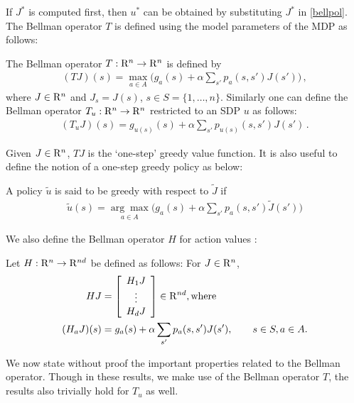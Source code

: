 If $J^*$ is computed first, then $u^*$ can be obtained by substituting $J^*$ in \eqref{bellpol}. The Bellman operator $T$ is defined using the model parameters of the MDP as follows:
\begin{definition}
The Bellman operator $T: \mathrm{R}^n \to \mathrm{R}^n$ is defined by 
\begin{align}
(TJ)(s)=\max_{a \in A}\big(g_a(s)+\alpha \sum_{s'} p_a(s,s')J(s')\big)\,, 
\end{align}
where $J\in \mathrm{R}^n$ and $J_s = J(s)$, $s\in S = \{1,\dots,n\}$.  
Similarly one can define the Bellman operator $T_u:\mathrm{R}^n \to \mathrm{R}^n$ restricted to an SDP $u$ as follows:
\begin{align}
(T_uJ)(s)=g_{u(s)}(s)+\alpha \sum_{s'} p_{u(s)}(s,s')J(s')\,.
\end{align}
\end{definition}
Given $J \in \mathrm{R}^n$, $TJ$ is the `one-step' greedy value function. It is also useful to define the notion of a one-step greedy policy as below:
\begin{definition}
A policy $\tilde{u}$ is said to be greedy with respect to $\tilde{J}$ if
\begin{align}\label{subpol}
\tilde{u}(s)=\underset{a \in A}{\arg\max}  \big(g_a(s)+\alpha\sum_{s'} p_a(s,s')\tilde{J}(s')\big)
\end{align}
\end{definition}
We also define the Bellman operator $H$ for action values  \cite{BertB}:
\begin{definition}\label{bellactval}
Let $H: \mathrm{R}^n \to \mathrm{R}^{nd}$ be defined as follows: For $J\in \mathrm{R}^n$,
\begin{align}
HJ&=\left[ {\begin{array}{c} H_1 J  \\ \vdots \\ H_d J\end{array}} \right]\in \mathrm{R}^{nd},\mbox{where}\nonumber\\
(H_a J)(s)&= g_a(s)+\alpha \sum_{s'}p_a(s,s') J(s'), \qquad s\in S, a\in A.
\end{align}
\end{definition}
 We now state without proof the important properties related to the Bellman operator. Though in these results, we make use of the Bellman operator $T$, the results also trivially hold for $T_u$ as well.

